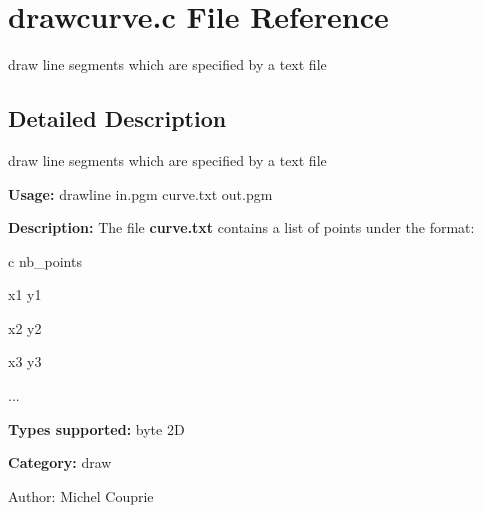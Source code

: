 \section{drawcurve.c File Reference}
\label{drawcurve_8c}
draw line segments which are specified by a text file  




\label{_details}
\subsection{Detailed Description}
draw line segments which are specified by a text file 

{\bf Usage:} drawline in.pgm curve.txt out.pgm

{\bf Description:} The file {\bf curve.txt} contains a list of points under the format:\par
 c nb\_\-points\par
 x1 y1\par
 x2 y2\par
 x3 y3\par
 ...\par


{\bf Types supported:} byte 2D

{\bf Category:} draw

\begin{Desc}
\item[Author:]Michel Couprie \end{Desc}
